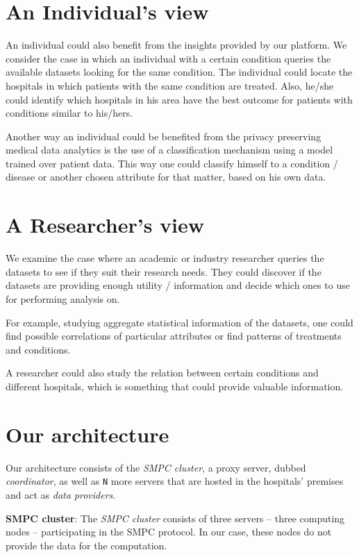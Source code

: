 \section{An Individual's view}
An individual could also benefit from the insights provided by our platform.
We consider the case in which an individual with a certain condition queries the available datasets looking for the same condition.
The individual could locate the hospitals in which patients with the same condition are treated.
Also, he/she could identify which hospitals in his area have the best outcome for patients with conditions similar to his/hers.


Another way an individual could be benefited from the privacy preserving medical data analytics is the use of a classification mechanism using a model trained over patient data.
This way one could classify himself to a condition / disease or another chosen attribute for that matter, based on his own data.


\section{A Researcher's view}
We examine the case where an academic or industry researcher queries the datasets to see if they suit their research needs.
They could discover if the datasets are providing enough utility / information and decide which ones to use for performing analysis on.

For example, studying aggregate statistical information of the datasets, one could find possible correlations of particular attributes or find patterns of treatments and conditions.

A researcher could also study the relation between certain conditions and different hospitals, which is something that could provide valuable information.



\section{Our architecture }\label{s:architecture}
Our architecture consists of the \textit{SMPC cluster}, a proxy server, dubbed \textit{coordinator}, as well as \texttt{N} more servers that are hosted in the hospitals' premises and act as \textit{data providers}.

\textbf{SMPC cluster}: The \textit{SMPC cluster} consists of three servers -- three computing nodes -- participating in the SMPC protocol. In our case, these nodes do not provide the data for the computation.


